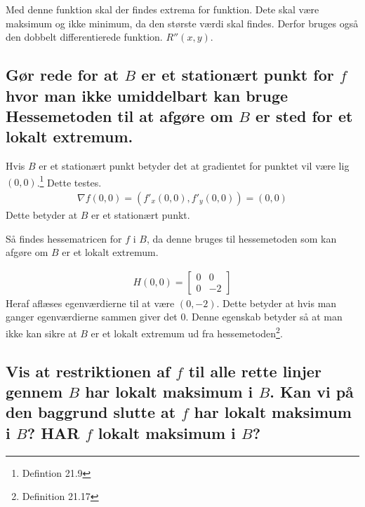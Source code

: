 Med denne funktion skal der findes extrema for funktion. Dete skal være maksimum og ikke minimum, da den største værdi skal findes. Derfor bruges også den dobbelt differentierede funktion. $R''(x,y)$. 

\subsection{Gør rede for at $B$ er et stationært punkt for $f$ hvor man ikke umiddelbart kan bruge Hessemetoden til at afgøre om $B$ er sted for et lokalt extremum.}

Hvis $B$ er et stationært punkt betyder det at gradientet for punktet vil være lig $(0,0)$.\footnote{Defintion 21.9} Dette testes.
\begin{align}
    \nabla f(0,0) = \left(f'_x(0,0),f'_y(0,0)\right) = (0,0)
\end{align}
Dette betyder at $B$ er et stationært punkt.

Så findes hessematricen for $f$ i $B$, da denne bruges til hessemetoden som kan afgøre om $B$ er et lokalt extremum.

\begin{align}
    H(0,0) = 
    \left[
        \begin{array}{cc}
            0 & 0\\0 & -2
        \end{array}
    \right] 
\end{align}
Heraf aflæses egenværdierne til at være $(0,-2)$.
Dette betyder at hvis man ganger egenværdierne sammen giver det 0. Denne egenskab betyder så at man ikke kan sikre at $B$ er et lokalt extremum ud fra hessemetoden\footnote{Definition 21.17}.



\subsection{Vis at restriktionen af $f$ til alle rette linjer gennem $B$ har lokalt maksimum i $B$. Kan vi på den baggrund slutte at $f$ har lokalt maksimum i $B$? HAR $f$ lokalt maksimum i $B$?}




